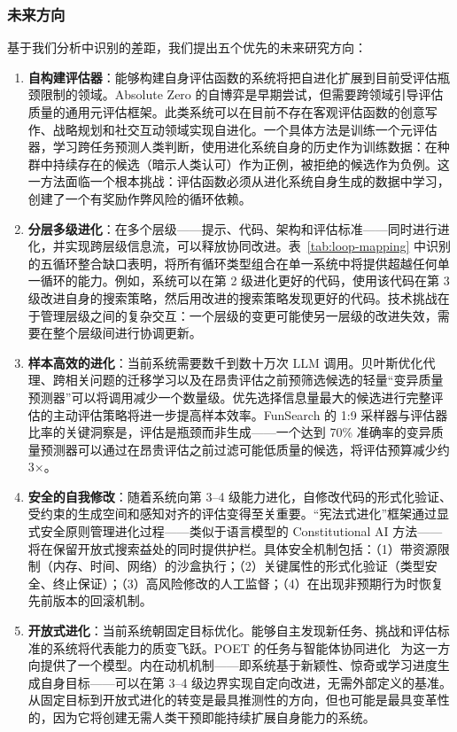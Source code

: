 \subsubsection{未来方向}

基于我们分析中识别的差距，我们提出五个优先的未来研究方向：

\begin{enumerate}
    \item \textbf{自构建评估器}：能够构建自身评估函数的系统将把自进化扩展到目前受评估瓶颈限制的领域。Absolute Zero 的自博弈是早期尝试，但需要跨领域引导评估质量的通用元评估框架。此类系统可以在目前不存在客观评估函数的创意写作、战略规划和社交互动领域实现自进化。一个具体方法是训练一个元评估器，学习跨任务预测人类判断，使用进化系统自身的历史作为训练数据：在种群中持续存在的候选（暗示人类认可）作为正例，被拒绝的候选作为负例。这一方法面临一个根本挑战：评估函数必须从进化系统自身生成的数据中学习，创建了一个有奖励作弊风险的循环依赖。

    \item \textbf{分层多级进化}：在多个层级——提示、代码、架构和评估标准——同时进行进化，并实现跨层级信息流，可以释放协同改进。表~\ref{tab:loop-mapping} 中识别的五循环整合缺口表明，将所有循环类型组合在单一系统中将提供超越任何单一循环的能力。例如，系统可以在第 2 级进化更好的代码，使用该代码在第 3 级改进自身的搜索策略，然后用改进的搜索策略发现更好的代码。技术挑战在于管理层级之间的复杂交互：一个层级的变更可能使另一层级的改进失效，需要在整个层级间进行协调更新。

    \item \textbf{样本高效的进化}：当前系统需要数千到数十万次 LLM 调用。贝叶斯优化代理、跨相关问题的迁移学习以及在昂贵评估之前预筛选候选的轻量``变异质量预测器''可以将调用减少一个数量级。优先选择信息量最大的候选进行完整评估的主动评估策略将进一步提高样本效率。FunSearch 的 1:9 采样器与评估器比率的关键洞察是，评估是瓶颈而非生成——一个达到 70\% 准确率的变异质量预测器可以通过在昂贵评估之前过滤可能低质量的候选，将评估预算减少约 3$\times$。

    \item \textbf{安全的自我修改}：随着系统向第 3--4 级能力进化，自修改代码的形式化验证、受约束的生成空间和感知对齐的评估变得至关重要。``宪法式进化''框架通过显式安全原则管理进化过程——类似于语言模型的 Constitutional AI 方法——将在保留开放式搜索益处的同时提供护栏。具体安全机制包括：（1）带资源限制（内存、时间、网络）的沙盒执行；（2）关键属性的形式化验证（类型安全、终止保证）；（3）高风险修改的人工监督；（4）在出现非预期行为时恢复先前版本的回滚机制。

    \item \textbf{开放式进化}：当前系统朝固定目标优化。能够自主发现新任务、挑战和评估标准的系统将代表能力的质变飞跃。POET 的任务与智能体协同进化~\citep{wang2020poet} 为这一方向提供了一个模型。内在动机机制——即系统基于新颖性、惊奇或学习进度生成自身目标——可以在第 3--4 级边界实现自定向改进，无需外部定义的基准。从固定目标到开放式进化的转变是最具推测性的方向，但也可能是最具变革性的，因为它将创建无需人类干预即能持续扩展自身能力的系统。
\end{enumerate}

